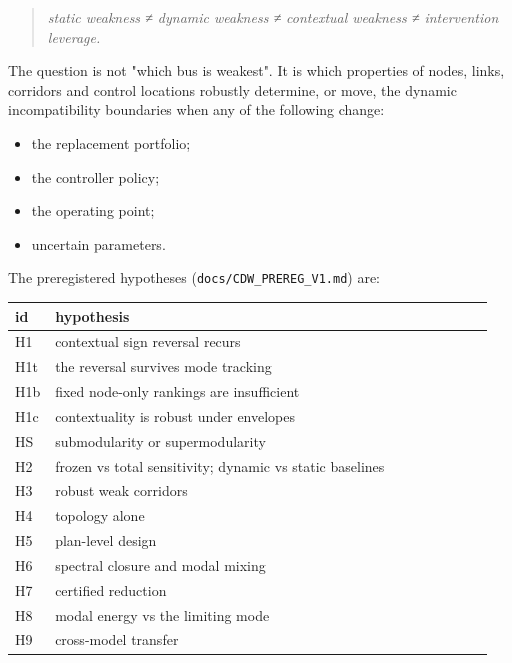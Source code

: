 \documentclass[10pt,a4paper]{article}
\begin{document}
\begin{quote}\itshape static weakness ≠ dynamic weakness ≠ contextual weakness ≠ intervention leverage.\end{quote}
The question is not "which bus is weakest". It is which properties of nodes, links, corridors and control locations robustly determine, or move, the dynamic incompatibility boundaries when any of the following change:

\begin{itemize}
\item the replacement portfolio;
\item the controller policy;
\item the operating point;
\item uncertain parameters.
\end{itemize}
The preregistered hypotheses (\texttt{docs/\allowbreak{}CDW\_\allowbreak{}PREREG\_\allowbreak{}V1.md}) are:

{\small
\begin{longtable}{L{0.060\linewidth}L{0.892\linewidth}}
\toprule
\textbf{id} & \textbf{hypothesis} \\
\midrule
\endhead
H1 & contextual sign reversal recurs \\
H1t & the reversal survives mode tracking \\
H1b & fixed node-only rankings are insufficient \\
H1c & contextuality is robust under envelopes \\
HS & submodularity or supermodularity \\
H2 & frozen vs total sensitivity; dynamic vs static baselines \\
H3 & robust weak corridors \\
H4 & topology alone \\
H5 & plan-level design \\
H6 & spectral closure and modal mixing \\
H7 & certified reduction \\
H8 & modal energy vs the limiting mode \\
H9 & cross-model transfer \\
\bottomrule
\end{longtable}}
\end{document}
